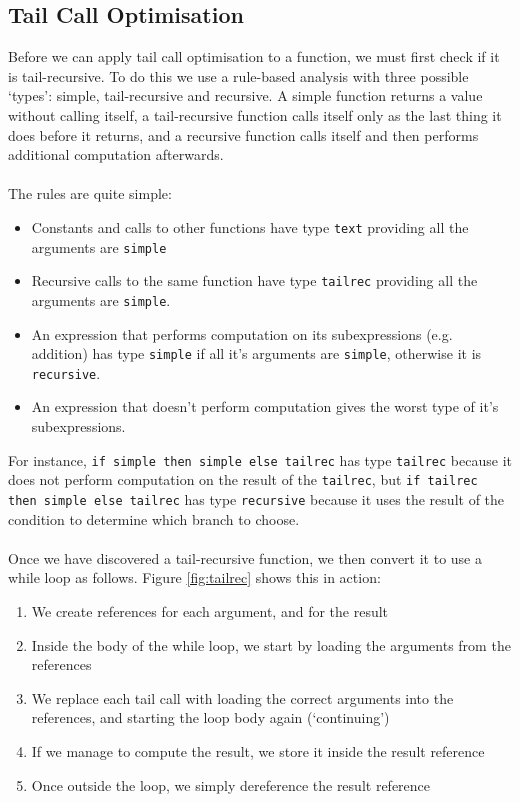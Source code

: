 \documentclass[12pt,twoside,notitlepage]{report}
\newcommand{\textinline}{\texttt}
\newcommand{\camlinline}{\texttt}
\begin{document}
\subsection{Tail Call Optimisation}
Before we can apply tail call optimisation to a function, we must first check if it is tail-recursive. To do this we use a rule-based analysis with three possible `types': simple, tail-recursive and recursive. A simple function returns a value without calling itself, a tail-recursive function calls itself only as the last thing it does before it returns, and a recursive function calls itself and then performs additional computation afterwards.
\\\\
The rules are quite simple:
\begin{itemize}
	\item Constants and calls to other functions have type \textinline{text} providing all the arguments are \textinline{simple}
	\item Recursive calls to the same function have type \textinline{tailrec} providing all the arguments are \textinline{simple}.
	\item An expression that performs computation on its subexpressions (e.g. addition) has type \textinline{simple} if all it's arguments are \textinline{simple}, otherwise it is \textinline{recursive}.
	\item An expression that doesn't perform computation gives the worst type of it's subexpressions.
\end{itemize}
For instance, \camlinline{if simple then simple else tailrec} has type \textinline{tailrec} because it does not perform computation on the result of the \textinline{tailrec}, but \camlinline{if tailrec then simple else tailrec} has type \textinline{recursive} because it uses the result of the condition to determine which branch to choose.
\\\\
Once we have discovered a tail-recursive function, we then convert it to use a while loop as follows. Figure \ref{fig:tailrec} shows this in action:
\begin{enumerate}
	\item We create references for each argument, and for the result
	\item Inside the body of the while loop, we start by loading the arguments from the references
	\item We replace each tail call with loading the correct arguments into the references, and starting the loop body again (`continuing')
	\item If we manage to compute the result, we store it inside the result reference
	\item Once outside the loop, we simply dereference the result reference
\end{enumerate}
\end{document}
